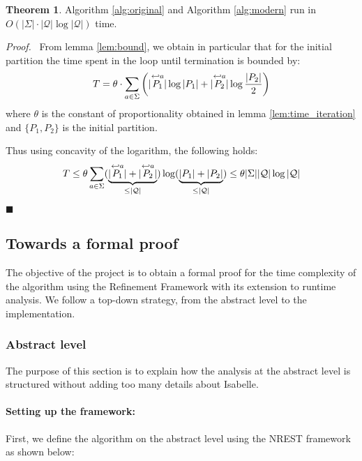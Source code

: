 \documentclass[12pt, a4 paper]{article}
\renewenvironment{proof}[1][Proof]{\begin{mdframed}[backgroundcolor=black!5, topline=false, rightline=false, bottomline=false, linecolor=black!15, linewidth=3pt]{\noindent\textit{#1.}\ }}{\noindent\par\hfill$\blacksquare$\end{mdframed}}
\theoremstyle{definition}
\newtheorem{theorem}{Theorem}
\begin{document}
\begin{theorem}
    \label{thm:complexity}
    Algorithm \ref{alg:original} and Algorithm \ref{alg:modern} run in $O\left(|\Sigma|\cdot|\mathcal{Q}| \log |\mathcal{Q}|\right)$ time.
\end{theorem}
\begin{proof}
From lemma \ref{lem:bound}, we obtain in particular that for the initial partition the time spent in the loop until termination is bounded by:
$$T = \theta \cdot \sum_{a \in \Sigma}\left(| \overset{\hookleftarrow {a}}{P_1} | \log | P_1 | + | \overset{\hookleftarrow {a}}{P_2} | \log \frac{| P_2 |}{2}\right)$$
where $\theta$ is the constant of proportionality obtained in lemma \ref{lem:time_iteration} and $\{P_1, P_2\}$ is the initial partition.

Thus using concavity of the logarithm, the following holds:
$$T \leq \theta \sum_{a \in \Sigma} (\underset{\leq |\mathcal{Q}|}{\underbrace{|\overset{\hookleftarrow {a}}{P_1}| + |\overset{\hookleftarrow {a}}{P_2}|}})\log(\underset{\leq |\mathcal{Q}|}{\underbrace{|P_1| + |P_2|}}) \leq \theta|\Sigma||\mathcal{Q}| \log |\mathcal{Q}|$$
\end{proof}

\subsection{Towards a formal proof}
The objective of the project is to obtain a formal proof for the time complexity of the algorithm using the Refinement Framework with its extension to runtime analysis.
We follow a top-down strategy, from the abstract level to the implementation.

\subsubsection{Abstract level}

The purpose of this section is to explain how the analysis at the abstract level is structured without adding too many details about Isabelle.

\paragraph{Setting up the framework:}
First, we define the algorithm on the abstract level using the NREST framework as shown below:
\end{document}
